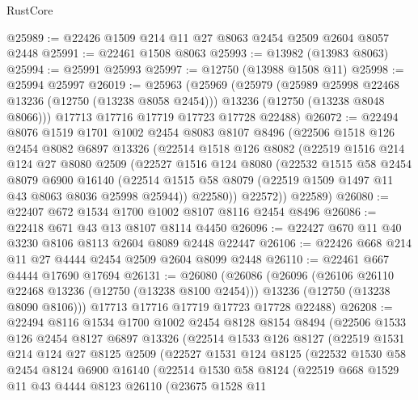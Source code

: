\begin{lexlean}{RustCore}
\begin{coremodule}
@25989 := @22426 @1509 @214 @11 @27 @8063 @2454 @2509 @2604 @8057 @2448
@25991 := @22461 @1508 @8063
@25993 := @13982 (@13983 @8063)
@25994 := @25991 @25993
@25997 := @12750 (@13988 @1508 @11)
@25998 := @25994 @25997
@26019 := @25963
    (@25969
      (@25979
        (@25989 @25998 @22468 @13236 (@12750 (@13238 @8058 @2454)))
        @13236
        (@12750 (@13238 @8048 @8066)))
      @17713
      @17716
      @17719
      @17723
      @17728
      @22488)
@26072 := @22494
    @8076
    @1519
    @1701
    @1002
    @2454
    @8083
    @8107
    @8496
    (@22506
      @1518
      @126
      @2454
      @8082
      @6897
      @13326
      (@22514
        @1518
        @126
        @8082
        (@22519
          @1516
          @214
          @124
          @27
          @8080
          @2509
          (@22527
            @1516
            @124
            @8080
            (@22532
              @1515
              @58
              @2454
              @8079
              @6900
              @16140
              (@22514 @1515 @58 @8079 (@22519 @1509 @1497 @11 @43 @8063 @8036 @25998 @25944))
              @22580))
          @22572))
      @22589)
@26080 := @22407 @672 @1534 @1700 @1002 @8107 @8116 @2454 @8496
@26086 := @22418 @671 @43 @13 @8107 @8114 @4450
@26096 := @22427 @670 @11 @40 @3230 @8106 @8113 @2604 @8089 @2448 @22447
@26106 := @22426 @668 @214 @11 @27 @4444 @2454 @2509 @2604 @8099 @2448
@26110 := @22461 @667 @4444 @17690 @17694
@26131 := @26080
    (@26086
      (@26096
        (@26106 @26110 @22468 @13236 (@12750 (@13238 @8100 @2454)))
        @13236
        (@12750 (@13238 @8090 @8106)))
      @17713
      @17716
      @17719
      @17723
      @17728
      @22488)
@26208 := @22494
    @8116
    @1534
    @1700
    @1002
    @2454
    @8128
    @8154
    @8494
    (@22506
      @1533
      @126
      @2454
      @8127
      @6897
      @13326
      (@22514
        @1533
        @126
        @8127
        (@22519
          @1531
          @214
          @124
          @27
          @8125
          @2509
          (@22527
            @1531
            @124
            @8125
            (@22532
              @1530
              @58
              @2454
              @8124
              @6900
              @16140
              (@22514
                @1530
                @58
                @8124
                (@22519
                  @668
                  @1529
                  @11
                  @43
                  @4444
                  @8123
                  @26110
                  (@23675
                    @1528
                    @11

\end{coremodule}
\end{lexlean}

